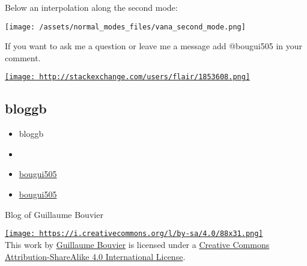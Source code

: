 \documentclass[
]{article}
\providecommand{\tightlist}{%
  \setlength{\itemsep}{0pt}\setlength{\parskip}{0pt}}
\begin{document}
Below an interpolation along the second mode:

\texttt{[image: /assets/normal\_modes\_files/vana\_second\_mode.png]}

{If you want to ask me a question or leave me a message add @bougui505
in your comment.}

\href{http://stackexchange.com/users/1853608/bougui}{\texttt{[image: http://stackexchange.com/users/flair/1853608.png]}}

\hypertarget{bloggb}{%
\subsection{bloggb}\label{bloggb}}

\begin{itemize}
\tightlist
\item
  bloggb
\item
  \href{mailto:}{}
\end{itemize}

\begin{itemize}
\tightlist
\item
  \href{https://github.com/bougui505}{{ } {bougui505}}
\item
  \href{https://twitter.com/bougui505}{{ } {bougui505}}
\end{itemize}

Blog of Guillaume Bouvier

\href{http://creativecommons.org/licenses/by-sa/4.0/}{\texttt{[image: https://i.creativecommons.org/l/by-sa/4.0/88x31.png]}}\\
This work by \href{http://izar.crabdance.com/}{Guillaume Bouvier} is
licensed under a
\href{http://creativecommons.org/licenses/by-sa/4.0/}{Creative Commons
Attribution-ShareAlike 4.0 International License}.
\end{document}
